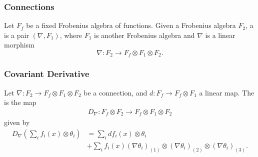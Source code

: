 \documentclass{beamer}
\begin{document}
\begin{frame}


\frametitle{Connections}


Let $F_f$ be a fixed Frobenius algebra of functions. Given a Frobenius algebra $F_2$, a  is a pair $(\nabla, F_1)$, where $F_1$ is another Frobenius algebra and $\nabla$ is a linear morphism 
\begin{equation}
\nabla: F_2 \to F_f \otimes F_1 \otimes F_2.
\end{equation}




\end{frame}




\begin{frame}


\frametitle{Covariant Derivative}

Let $\nabla: F_2 \to F_f \otimes F_1 \otimes F_2$ be a connection, and $d: F_f \to F_f \otimes F_1$ a linear map. The  is the map
\begin{align*}
D_\nabla: F_f \otimes F_2 \to F_f \otimes F_1 \otimes F_2
\end{align*}
given by
\begin{align*}
D_\nabla(\sum_i f_i(x) \otimes \theta_i) &= \sum_i d f_i(x) \otimes \theta_i \\
&+ \sum_i f_i(x) (\nabla \theta_i)_{(1)} \otimes (\nabla \theta_i)_{(2)} \otimes (\nabla \theta_i)_{(3)}.
\end{align*}


\end{frame}



\end{document}
